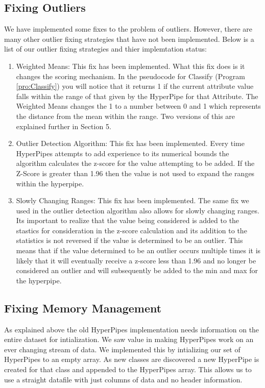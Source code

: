 \subsection{Fixing Outliers}
We have implemented some fixes to the problem of outliers. 
However, there are many other outlier fixing strategies that have 
not been implemented. Below is a list of our outlier fixing 
strategies and thier implemtation status:
\begin{enumerate}
\item Weighted Means: This fix has been implemented. What this fix 
does is it changes the scoring mechanism. In the pseudocode for 
Classify (Program \ref{pro:Classify}) you will notice that it returns 1 if the current attribute 
value falls within the range of that given by the HyperPipe for that 
Attribute. The Weighted Means changes the 1 to a number between 0 
and 1 which represents the distance from the mean within the range. 
Two versions of this are explained further in Section 5.
\item Outlier Detection Algorithm: This fix has been implemented. 
Every time HyperPipes attempts to add experience to its numerical bounds
the algorithm calculates the z-score\cite{Larsen01} for the value attempting to be added. 
If the Z-Score is greater than 1.96 then the value is not used to expand
the ranges within the hyperpipe.
\item Slowly Changing Ranges: This fix has been implemented. 
The same fix we used in the outlier detection algorithm also allows for 
slowly changing ranges. Its important to realize that the value being
considered is added to the stastics for consideration in the z-score 
calculation and its addition to the statistics is not reversed if the
value is determined to be an outlier. This means that if the value 
determined to be an outlier occurs multiple times it is likely that 
it will eventually receive a z-score less than 1.96 and no longer be
considered an outlier and will subsequently be added to the min and max
for the hyperpipe.
\end{enumerate}


\subsection{Fixing Memory Management}
As explained above the old HyperPipes implementation needs information 
on the entire dataset for intialization. We saw value in making 
HyperPipes work on an ever changing stream of data. We implemented this 
by intializing our set of HyperPipes to an empty array. As new classes 
are discovered a new HyperPipe is created for that class and appended 
to the HyperPipes array. This allows us to use a straight datafile with 
just columns of data and no header information. 

